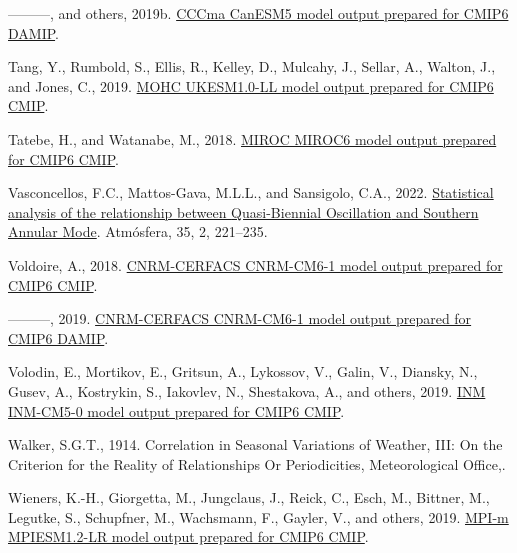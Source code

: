 \documentclass[12pt,oneside]{reedthesis}
\newlength{\cslhangindent}
\newenvironment{CSLReferences}[2] %
 {%
  \setlength{\parindent}{0pt}
  \ifodd #1 \everypar{\setlength{\hangindent}{\cslhangindent}}\ignorespaces\fi
  \ifnum #2 > 0
  \setlength{\parskip}{#2\baselineskip}
  \fi
 }%
 {}
\begin{document}
\begin{CSLReferences}{1}{0}
\leavevmode{}%
---------, and others, 2019b. \href{https://doi.org/10.22033/ESGF/CMIP6.1305}{CCCma CanESM5 model output prepared for CMIP6 DAMIP}.

\leavevmode{}%
Tang, Y., Rumbold, S., Ellis, R., Kelley, D., Mulcahy, J., Sellar, A., Walton, J., and Jones, C., 2019. \href{https://doi.org/10.22033/ESGF/CMIP6.1569}{MOHC UKESM1.0-LL model output prepared for CMIP6 CMIP}.

\leavevmode{}%
Tatebe, H., and Watanabe, M., 2018. \href{https://doi.org/10.22033/ESGF/CMIP6.881}{MIROC MIROC6 model output prepared for CMIP6 CMIP}.

\leavevmode{}%
Vasconcellos, F.C., Mattos-Gava, M.L.L., and Sansigolo, C.A., 2022. \href{https://doi.org/10.20937/ATM.52910}{Statistical analysis of the relationship between {Quasi-Biennial Oscillation} and {Southern Annular Mode}}. Atmósfera, 35, 2, 221--235.

\leavevmode{}%
Voldoire, A., 2018. \href{https://doi.org/10.22033/ESGF/CMIP6.1375}{CNRM-CERFACS CNRM-CM6-1 model output prepared for CMIP6 CMIP}.

\leavevmode{}%
---------, 2019. \href{https://doi.org/10.22033/ESGF/CMIP6.1376}{CNRM-CERFACS CNRM-CM6-1 model output prepared for CMIP6 DAMIP}.

\leavevmode{}%
Volodin, E., Mortikov, E., Gritsun, A., Lykossov, V., Galin, V., Diansky, N., Gusev, A., Kostrykin, S., Iakovlev, N., Shestakova, A., and others, 2019. \href{https://doi.org/10.22033/ESGF/CMIP6.1423}{INM INM-CM5-0 model output prepared for CMIP6 CMIP}.

\leavevmode{}%
Walker, S.G.T., 1914. Correlation in {Seasonal Variations} of {Weather}, {III}: {On} the {Criterion} for the {Reality} of {Relationships Or Periodicities}, {Meteorological Office},.

\leavevmode{}%
Wieners, K.-H., Giorgetta, M., Jungclaus, J., Reick, C., Esch, M., Bittner, M., Legutke, S., Schupfner, M., Wachsmann, F., Gayler, V., and others, 2019. \href{https://doi.org/10.22033/ESGF/CMIP6.742}{MPI-m MPIESM1.2-LR model output prepared for CMIP6 CMIP}.


\end{CSLReferences}
\end{document}
